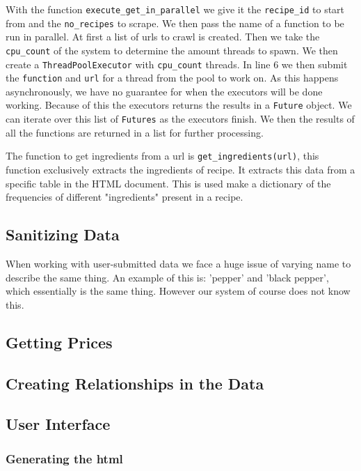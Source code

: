 \documentclass{article}
\begin{document}


With the function \texttt{execute\_get\_in\_parallel} we give it the \texttt{recipe\_id}
to start from and the \texttt{no\_recipes} to scrape. We then pass the name of a
function to be run in parallel. At first a list of urls to crawl is created. Then we take
the \texttt{cpu\_count} of the system to determine the amount threads to spawn. We then
create a \texttt{ThreadPoolExecutor} with \texttt{cpu\_count} threads. In line 6 we then
submit the \texttt{function} and \texttt{url} for a thread from the pool to work on. As
this happens asynchronously, we have no guarantee for when the executors will be done
working. Because of this the executors returns the results in a \texttt{Future} object. We
can iterate over this list of \texttt{Futures} as the executors finish. We then the
results of all the functions are returned in a list for further processing.

The function to get ingredients from a url is \texttt{get\_ingredients(url)}, this
function exclusively extracts the ingredients of recipe. It extracts this data from a
specific table in the HTML document. This is used make a dictionary of the frequencies of
different "ingredients" present in a recipe.

\subsection{Sanitizing Data}
When working with user-submitted data we face a huge issue of varying name to describe the
same thing. An example of this is: 'pepper' and 'black pepper', which essentially is the
same thing. However our system of course does not know this.

\subsection{Getting Prices}

\subsection{Creating Relationships in the Data}

\subsection{User Interface}
\subsubsection{Generating the html}
\end{document}

